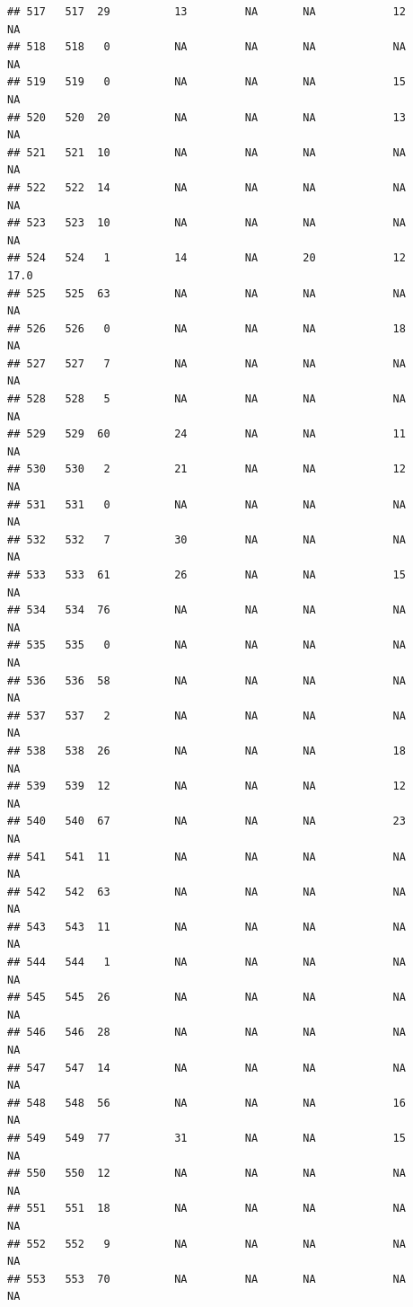 \documentclass[man]{apa6}
\begin{document}
\begin{verbatim}
## 517   517  29          13         NA       NA            12       NA
## 518   518   0          NA         NA       NA            NA       NA
## 519   519   0          NA         NA       NA            15       NA
## 520   520  20          NA         NA       NA            13       NA
## 521   521  10          NA         NA       NA            NA       NA
## 522   522  14          NA         NA       NA            NA       NA
## 523   523  10          NA         NA       NA            NA       NA
## 524   524   1          14         NA       20            12     17.0
## 525   525  63          NA         NA       NA            NA       NA
## 526   526   0          NA         NA       NA            18       NA
## 527   527   7          NA         NA       NA            NA       NA
## 528   528   5          NA         NA       NA            NA       NA
## 529   529  60          24         NA       NA            11       NA
## 530   530   2          21         NA       NA            12       NA
## 531   531   0          NA         NA       NA            NA       NA
## 532   532   7          30         NA       NA            NA       NA
## 533   533  61          26         NA       NA            15       NA
## 534   534  76          NA         NA       NA            NA       NA
## 535   535   0          NA         NA       NA            NA       NA
## 536   536  58          NA         NA       NA            NA       NA
## 537   537   2          NA         NA       NA            NA       NA
## 538   538  26          NA         NA       NA            18       NA
## 539   539  12          NA         NA       NA            12       NA
## 540   540  67          NA         NA       NA            23       NA
## 541   541  11          NA         NA       NA            NA       NA
## 542   542  63          NA         NA       NA            NA       NA
## 543   543  11          NA         NA       NA            NA       NA
## 544   544   1          NA         NA       NA            NA       NA
## 545   545  26          NA         NA       NA            NA       NA
## 546   546  28          NA         NA       NA            NA       NA
## 547   547  14          NA         NA       NA            NA       NA
## 548   548  56          NA         NA       NA            16       NA
## 549   549  77          31         NA       NA            15       NA
## 550   550  12          NA         NA       NA            NA       NA
## 551   551  18          NA         NA       NA            NA       NA
## 552   552   9          NA         NA       NA            NA       NA
## 553   553  70          NA         NA       NA            NA       NA

\end{verbatim}
\end{document}
